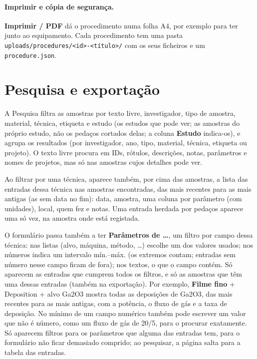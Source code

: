 \documentclass[11pt,a4paper]{article}
\newcommand{\ui}[1]{\textsf{\textbf{#1}}}
\newcommand{\menu}[1]{\textsf{#1}}
\begin{document}
\paragraph{Imprimir e cópia de segurança.} \ui{Imprimir / PDF} dá o
procedimento numa folha A4, por exemplo para ter junto ao equipamento. Cada procedimento
tem uma pasta \texttt{uploads/procedures/<id>-<título>/} com os seus
ficheiros e um \texttt{procedure.json}.

\section{Pesquisa e exportação}\label{sec:search}

A \menu{Pesquisa} filtra as amostras por texto livre, investigador, tipo de
amostra, material, técnica, etiqueta e estudo (os estudos que pode ver; as
amostras do próprio estudo, não os pedaços cortados delas; a coluna
\ui{Estudo} indica-os), e agrupa os resultados (por
investigador, ano, tipo, material, técnica, etiqueta ou projeto). O texto
livre procura em IDs, rótulos, descrições, notas, parâmetros e nomes de
projetos, mas só nas amostras cujos detalhes pode ver.

Ao filtrar por uma técnica, aparece também, por cima das amostras, a lista
das entradas dessa técnica nas amostras encontradas, das mais recentes para
as mais antigas (as sem data no fim): data, amostra, uma coluna por
parâmetro (com unidades), local, quem fez e notas. Uma entrada herdada por
pedaços aparece uma só vez, na amostra onde está registada.

O formulário passa também a ter \ui{Parâmetros de \ldots}, um filtro por
campo dessa técnica: nas listas (alvo, máquina, método, \ldots) escolhe um
dos valores usados; nos números indica um intervalo mín.--máx. (os extremos
contam; entradas sem número nesse campo ficam de fora); nos textos, o que o
campo contém. Só aparecem as entradas que cumprem todos os filtros, e só as
amostras que têm uma dessas entradas (também na exportação). Por exemplo,
\ui{Filme fino} + Deposition + alvo Ga2O3 mostra todas as deposições de
Ga2O3, das mais recentes para as mais antigas, com a potência, o fluxo de
gás e a taxa de deposição. No mínimo de um campo numérico também pode
escrever um valor que não é número, como um fluxo de gás de 20/5, para o
procurar exatamente. Só aparecem filtros para os parâmetros que alguma das
entradas tem, para o formulário não ficar demasiado comprido; ao pesquisar,
a página salta para a tabela das entradas.
\end{document}
